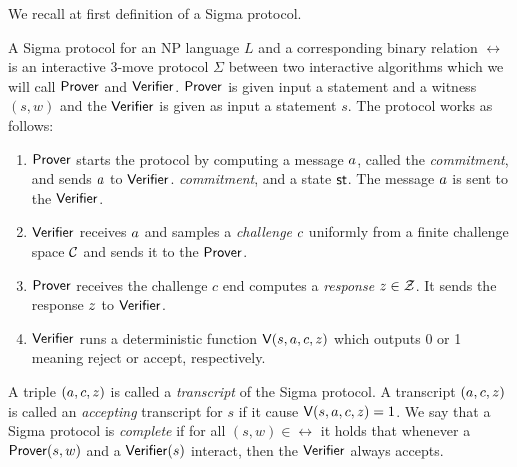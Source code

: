 We recall at first definition of a Sigma protocol. 

\begin{definition} A Sigma protocol for an NP language $L$ and a corresponding binary relation $\rel$ is an interactive 3-move protocol $\Sigma$ between two interactive algorithms which we will call $\mathsf{Prover}$ and $\mathsf{Verifier}$. $\mathsf{Prover}$ is given input a statement and a witness $(s, w)$ and the $\mathsf{Verifier}$ is given as input a statement $s$. The protocol works as follows:
\begin{enumerate}
\item $\mathsf{Prover}$ starts the protocol by computing a message $a$, called the \emph{commitment}, and sends $a$ to $\mathsf{Verifier}$. \emph{commitment}, and a state $\mathsf{st}$. The message $a$ is sent to the $\mathsf{Verifier}$.
\item $\mathsf{Verifier}$ receives $a$ and samples a \emph{challenge} $c$ uniformly from a finite challenge space $\mathcal{C}$ and sends it to the $\mathsf{Prover}$.
\item $\mathsf{Prover}$ receives the challenge $c$ end computes a \emph{response} $z \in \mathcal{Z}$. It sends the response $z$ to $\mathsf{Verifier}$.
\item $\mathsf{Verifier}$ runs a deterministic function $\mathsf{V}(s,a,c,z)$ which outputs 0 or 1 meaning reject or accept, respectively.
\end{enumerate}
A triple $(a,c,z)$ is called a \emph{transcript} of the Sigma protocol. A transcript $(a,c,z)$ is called an \emph{accepting} transcript for $s$ if it cause $\mathsf{V}(s,a,c,z) =1$. 
We say that a Sigma protocol is \emph{complete} if for all $(s, w) \in \rel$ it holds that whenever a $\mathsf{Prover}(s,w)$ and a $\mathsf{Verifier}(s)$ interact, then the $\mathsf{Verifier}$ always accepts. 
\end{definition}



